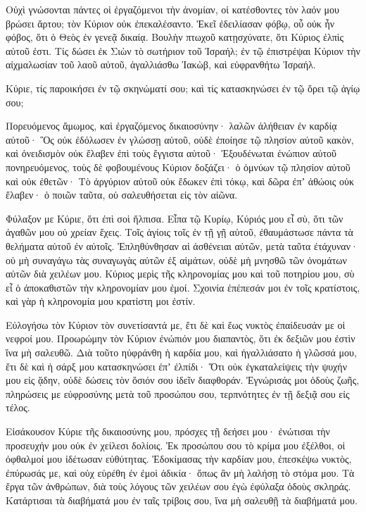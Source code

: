 \begin{spacing}{1.1}
\begin{multicols}{2}
Οὐχὶ γνώσονται πάντες οἱ ἐργαζόμενοι τὴν ἀνομίαν, οἱ κατέσθοντες τὸν λαόν μου βρώσει ἄρτου; τὸν Κύριον οὐκ ἐπεκαλέσαντο.
Ἐκεῖ ἐδειλίασαν φόβῳ, οὗ οὐκ ἦν φόβος, ὅτι ὁ Θεὸς ἐν γενεᾷ δικαίᾳ.
Βουλὴν πτωχοῦ κατῃσχύνατε, ὅτι Κύριος ἐλπὶς αὐτοῦ ἐστι.
Τίς δώσει ἐκ Σιὼν τὸ σωτήριον τοῦ Ἰσραήλ; ἐν τῷ ἐπιστρέψαι Κύριον τὴν αἰχμαλωσίαν τοῦ λαοῦ αὐτοῦ, ἀγαλλιάσθω Ἰακὼβ, καὶ εὐφρανθήτω Ἰσραήλ.

Κύριε, τίς παροικήσει ἐν τῷ σκηνώματί σου; καὶ τίς κατασκηνώσει ἐν τῷ ὄρει τῷ ἁγίῳ σου;

Πορευόμενος ἄμωμος, καὶ ἐργαζόμενος δικαιοσύνην· λαλῶν ἀλήθειαν ἐν καρδίᾳ αὐτοῦ·
Ὃς οὐκ ἐδόλωσεν ἐν γλώσσῃ αὐτοῦ, οὐδὲ ἐποίησε τῷ πλησίον αὐτοῦ κακὸν, καὶ ὀνειδισμὸν οὐκ ἔλαβεν ἐπὶ τοὺς ἔγγιστα αὐτοῦ·
Ἐξουδένωται ἐνώπιον αὐτοῦ πονηρευόμενος, τοὺς δὲ φοβουμένους Κύριον δοξάζει· ὁ ὀμνύων τῷ πλησίον αὐτοῦ καὶ οὐκ ἐθετῶν·
Τὸ ἀργύριον αὐτοῦ οὐκ ἔδωκεν ἐπὶ τόκῳ, καὶ δῶρα ἐπʼ ἀθώοις οὐκ ἔλαβεν· ὁ ποιῶν ταῦτα, οὐ σαλευθήσεται εἰς τὸν αἰῶνα.

Φύλαξον με Κύριε, ὅτι ἐπὶ σοὶ ἤλπισα.
Εἶπα τῷ Κυρίῳ, Κύριός μου εἶ σὺ, ὅτι τῶν ἀγαθῶν μου οὐ χρείαν ἔχεις.
Τοῖς ἁγίοις τοῖς ἐν τῇ γῇ αὐτοῦ, ἐθαυμάστωσε πάντα τὰ θελήματα αὐτοῦ ἐν αὐτοῖς.
Ἐπληθύνθησαν αἱ ἀσθένειαι αὐτῶν, μετὰ ταῦτα ἐτάχυναν· οὐ μὴ συναγάγω τὰς συναγωγὰς αὐτῶν ἐξ αἱμάτων, οὐδὲ μὴ μνησθῶ τῶν ὀνομάτων αὐτῶν διὰ χειλέων μου.
Κύριος μερὶς τῆς κληρονομίας μου καὶ τοῦ ποτηρίου μου, σὺ εἶ ὁ ἀποκαθιστῶν τὴν κληρονομίαν μου ἐμοί.
Σχοινία ἐπέπεσάν μοι ἐν τοῖς κρατίστοις, καὶ γὰρ ἡ κληρονομία μου κρατίστη μοι ἐστίν.

Εὐλογήσω τὸν Κύριον τὸν συνετίσαντά με, ἔτι δὲ καὶ ἕως νυκτὸς ἐπαίδευσάν με οἱ νεφροί μου.
Προωρώμην τὸν Κύριον ἐνώπιόν μου διαπαντὸς, ὅτι ἐκ δεξιῶν μου ἐστὶν ἵνα μὴ σαλευθῶ.
Διὰ τοῦτο ηὐφράνθη ἡ καρδία μου, καὶ ἠγαλλιάσατο ἡ γλῶσσά μου, ἔτι δὲ καὶ ἡ σάρξ μου κατασκηνώσει ἐπʼ ἐλπίδι·
Ὅτι οὐκ ἐγκαταλείψεις τὴν ψυχήν μου εἰς ᾅδην, οὐδὲ δώσεις τὸν ὅσιόν σου ἰδεῖν διαφθοράν.
Ἐγνώρισάς μοι ὁδοὺς ζωῆς, πληρώσεις με εὐφροσύνης μετὰ τοῦ προσώπου σου, τερπνότητες ἐν τῇ δεξιᾷ σου εἰς τέλος.

Εἰσάκουσον Κύριε τῆς δικαιοσύνης μου, πρόσχες τῇ δεήσει μου· ἐνώτισαι τὴν προσευχήν μου οὐκ ἐν χείλεσι δολίοις.
Ἐκ προσώπου σου τὸ κρίμα μου ἐξέλθοι, οἱ ὀφθαλμοί μου ἰδέτωσαν εὐθύτητας.
Ἐδοκίμασας τὴν καρδίαν μου, ἐπεσκέψω νυκτὸς, ἐπύρωσάς με, καὶ οὐχ εὑρέθη ἐν ἐμοὶ ἀδικία·
ὅπως ἂν μὴ λαλήσῃ τὸ στόμα μου. Τὰ ἔργα τῶν ἀνθρώπων, διὰ τοὺς λόγους τῶν χειλέων σου ἐγὼ ἐφύλαξα ὁδοὺς σκληράς.
Κατάρτισαι τὰ διαβήματά μου ἐν ταῖς τρίβοις σου, ἵνα μὴ σαλευθῇ τὰ διαβήματά μου.


\end{multicols}
\end{spacing}
